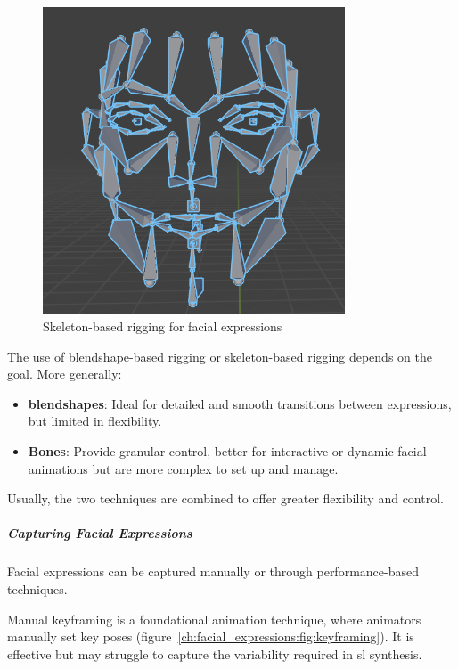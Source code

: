 \documentclass[../../main.tex]{subfiles}
\begin{document}
\begin{figure}
    \centering
    \includegraphics[width=0.8\textwidth]{chapters/background_work/images/facial_bones.png}
    \caption{Skeleton-based rigging for facial expressions}
    \label{ch:facial_expressions:fig:skeleton_based_rigging}
\end{figure}

The use of blendshape-based rigging or skeleton-based rigging depends on the goal. More generally: 

\begin{itemize}
  \item \textbf{blendshapes}: Ideal for detailed and smooth transitions between expressions, but limited in flexibility.
  \item \textbf{Bones}: Provide granular control, better for interactive or dynamic facial animations but are more complex to set up and manage.
\end{itemize}

Usually, the two techniques are combined to offer greater flexibility and control.

\subparagraph{Capturing Facial Expressions}
\label{ch:background_work:sign_language_synthesis:3d_techniques:avatar_animation:face_animation:capturing_facial_expressions}

Facial expressions can be captured manually or through performance-based techniques.

Manual keyframing is a foundational animation technique, where animators manually set key poses (figure~\ref{ch:facial_expressions:fig:keyframing}). It is effective but may struggle to capture the variability required in \gls{sl} synthesis.
\end{document}
